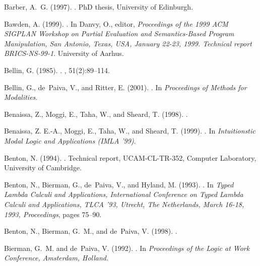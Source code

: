 \documentclass[a4paper]{amsart}
\begin{document}
\begin{thebibliography}{}
Barber, A.~G. (1997).
.
\newblock PhD thesis, University of Edinburgh.

Bawden, A. (1999).
.
\newblock In Danvy, O., editor, {\em Proceedings of the 1999 ACM SIGPLAN
  Workshop on Partial Evaluation and Semantics-Based Program Manipulation, San
  Antonio, Texas, USA, January 22-23, 1999. Technical report BRICS-NS-99-1}.
  University of Aarhus.

Bellin, G. (1985).
.
, 51(2):89--114.

Bellin, G., de~Paiva, V., and Ritter, E. (2001).
.
\newblock In {\em Proceedings of Methods for Modalities}.

Benaissa, Z., Moggi, E., Taha, W., and Sheard, T. (1998).
.

Benaissa, Z. E.-A., Moggi, E., Taha, W., and Sheard, T. (1999).
.
\newblock In {\em Intuitionstic Modal Logic and Applications (IMLA '99)}.

Benton, N. (1994).
.
\newblock Technical report, UCAM-CL-TR-352, Computer Laboratory, University of
  Cambridge.

Benton, N., Bierman, G., de~Paiva, V., and Hyland, M. (1993).
.
\newblock In {\em Typed Lambda Calculi and Applications, International
  Conference on Typed Lambda Calculi and Applications, TLCA '93, Utrecht, The
  Netherlands, March 16-18, 1993, Proceedings}, pages 75--90.

Benton, N., Bierman, G.~M., and de~Paiva, V. (1998).
.

Bierman, G.~M. and de~Paiva, V. (1992).
.
\newblock In {\em Proceedings of the Logic at Work Conference, Amsterdam,
  Holland.}


\end{thebibliography}
\end{document}
